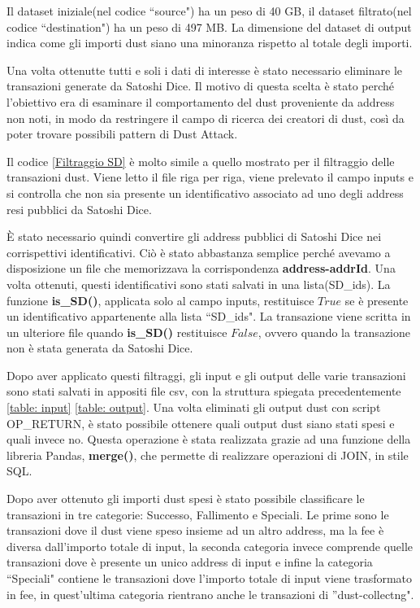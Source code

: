 Il dataset iniziale(nel codice ``source") ha un peso di 40 GB, il dataset filtrato(nel codice ``destination") ha un peso di 497 MB. La dimensione del dataset di output indica come gli importi dust siano una minoranza rispetto al totale degli importi.

Una volta ottenutte tutti e soli i dati di interesse è stato necessario eliminare le transazioni generate da Satoshi Dice. Il motivo di questa scelta è stato perché l'obiettivo era di esaminare il comportamento del dust proveniente da address non noti, in modo da restringere il campo di ricerca dei creatori di dust, così da poter trovare possibili pattern di Dust Attack.

Il codice \ref{Filtraggio SD} è molto simile a quello mostrato per il filtraggio delle transazioni dust. Viene letto il file riga per riga, viene prelevato il campo inputs e si controlla che non sia presente un identificativo associato ad uno degli address resi pubblici da Satoshi Dice. 

È stato necessario quindi convertire gli address pubblici di Satoshi Dice nei corrispettivi identificativi. Ciò è stato abbastanza semplice perché avevamo a disposizione un file che memorizzava la corrispondenza \textbf{address-addrId}. Una volta ottenuti, questi identificativi sono stati salvati in una lista(SD\_ids). La funzione \textbf{is\_SD()}, applicata solo al campo inputs, restituisce $True$ se è presente un identificativo appartenente alla lista ``SD\_ids". La transazione viene scritta in un ulteriore file quando \textbf{is\_SD()} restituisce $False$, ovvero quando la transazione non è stata generata da Satoshi Dice.

Dopo aver applicato questi filtraggi, gli input e gli output delle varie transazioni sono stati salvati in appositi file csv, con la struttura spiegata precedentemente \ref{table: input} \ref{table: output}. Una volta eliminati gli output dust con script OP\_RETURN, è stato possibile ottenere quali output dust siano stati spesi e quali invece no. Questa operazione è stata realizzata grazie ad una funzione della libreria Pandas, \textbf{merge()}, che permette di realizzare operazioni di JOIN, in stile SQL.

Dopo aver ottenuto gli importi dust spesi è stato possibile classificare le transazioni in tre categorie: Successo, Fallimento e Speciali. Le prime sono le transazioni dove il dust viene speso insieme ad un altro address, ma la fee è diversa dall'importo totale di input, la seconda categoria invece comprende quelle transazioni dove è presente un unico address di input e infine la categoria ``Speciali" contiene le transazioni dove l'importo totale di input viene trasformato in fee, in quest'ultima categoria rientrano anche le transazioni di ''dust-collectng". 

